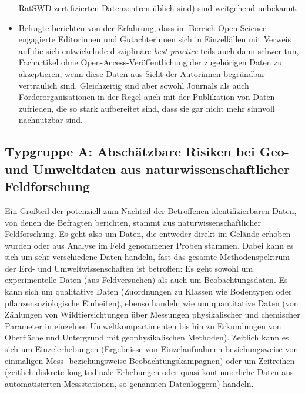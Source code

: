\documentclass[a4paper,
fontsize=11pt,
oneside,
numbers=noperiodatend,
parskip=half-,
bibliography=totoc,
final
]{scrartcl}
\begin{document}
\begin{itemize}
  RatSWD-zertifizierten Datenzentren üblich sind) sind weitgehend
  unbekannt.
\item
  Befragte berichten von der Erfahrung, dass im Bereich Open Science
  engagierte Editorinnen und Gutachterinnen sich in Einzelfällen mit
  Verweis auf die sich entwickelnde disziplinäre \emph{best practice}
  teils auch dann schwer tun, Fachartikel ohne
  Open-Access-Veröffentlich\-ung der zugehörigen Daten zu akzeptieren,
  wenn diese Daten aus Sicht der Autorinnen begründbar vertraulich sind.
  Gleichzeitig sind aber sowohl Journals als auch Förderorganisationen
  in der Regel auch mit der Publikation von Daten zufrieden, die so
  stark aufbereitet sind, dass sie gar nicht mehr sinnvoll nachnutzbar
  sind.
\end{itemize}

\hypertarget{typgruppe-a-abschuxe4tzbare-risiken-bei-geo--und-umweltdaten-aus-naturwissenschaftlicher-feldforschung}{%
\subsection{Typgruppe A: Abschätzbare Risiken bei Geo- und Umweltdaten
aus naturwissenschaftlicher
Feldforschung}\label{typgruppe-a-abschuxe4tzbare-risiken-bei-geo--und-umweltdaten-aus-naturwissenschaftlicher-feldforschung}}

Ein Großteil der potenziell zum Nachteil der Betroffenen
identifizierbaren Daten, von denen die Befragten berichten, stammt aus
naturwissenschaftlicher Feldforschung. Es geht also um Daten, die
entweder direkt im Gelände erhoben wurden oder aus Analyse im Feld
genommener Proben stammen. Dabei kann es sich um sehr verschiedene Daten
handeln, fast das gesamte Methodenspektrum der Erd- und
Umweltwissenschaften ist betroffen: Es geht sowohl um experimentelle
Daten (aus Feldversuchen) als auch um Beobachtungsdaten. Es kann sich um
qualitative Daten (Zuordnungen zu Klassen wie Bodentypen oder
pflanzensoziologische Einheiten), ebenso handeln wie um quantitative
Daten (von Zählungen von Wildtiersichtungen über Messungen
physikalischer und chemischer Parameter in einzelnen
Umweltkompartimenten bis hin zu Erkundungen von Oberfläche und
Untergrund mit geophysikalischen Methoden). Zeitlich kann es sich um
Einzelerhebungen (Ergebnisse von Einzelaufnahmen beziehungsweise von
einmaligen Mess- beziehungsweise Beobachtungskampagnen) oder um
Zeitreihen (zeitlich diskrete longitudinale Erhebungen oder
quasi-kontinuierliche Daten aus automatisierten Messstationen, so
genannten Datenloggern) handeln.
\end{document}
